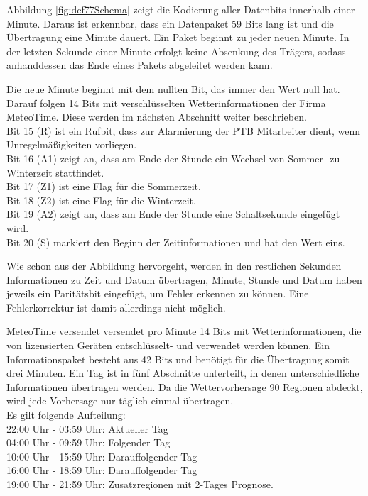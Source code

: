 \documentclass[a4paper,11pt]{article}
\newcounter{subsubsubsection}[subsubsection]
\begin{document}
\noindent
Abbildung \ref{fig:dcf77Schema} zeigt die Kodierung aller Datenbits innerhalb einer Minute. Daraus ist erkennbar, dass ein Datenpaket 59 Bits lang ist und
die Übertragung eine Minute dauert. Ein Paket beginnt zu jeder neuen Minute. In der letzten Sekunde einer Minute erfolgt keine Absenkung des Trägers, sodass anhanddessen
das Ende eines Pakets abgeleitet werden kann. 

\vspace{0.2cm}
\noindent
Die neue Minute beginnt mit dem nullten Bit, das immer den Wert null hat. Darauf folgen 14 Bits mit verschlüsselten Wetterinformationen der Firma MeteoTime.
Diese werden im nächsten Abschnitt weiter beschrieben. \\
Bit 15 (R) ist ein Rufbit, dass zur Alarmierung der PTB Mitarbeiter dient, wenn Unregelmäßigkeiten vorliegen. \\
Bit 16 (A1) zeigt an, dass am Ende der Stunde ein Wechsel von Sommer- zu Winterzeit stattfindet. \\
Bit 17 (Z1) ist eine Flag für die Sommerzeit. \\
Bit 18 (Z2) ist eine Flag für die Winterzeit. \\
Bit 19 (A2) zeigt an, dass am Ende der Stunde eine Schaltsekunde eingefügt wird. \\
Bit 20 (S) markiert den Beginn der Zeitinformationen und hat den Wert eins. 

\vspace{0.2cm}
\noindent
Wie schon aus der Abbildung hervorgeht, werden in den restlichen Sekunden Informationen zu Zeit und Datum übertragen, Minute, Stunde und Datum haben jeweils ein
Paritätsbit eingefügt, um Fehler erkennen zu können. Eine Fehlerkorrektur ist damit allerdings nicht möglich. 

\label{subsubsubsub:meteotime}

MeteoTime versendet versendet pro Minute 14 Bits mit Wetterinformationen, die von lizensierten Geräten entschlüsselt- und verwendet werden können. 
Ein Informationspaket besteht aus 42 Bits und benötigt für die Übertragung somit drei Minuten. Ein Tag ist in fünf Abschnitte unterteilt, in denen
unterschiedliche Informationen übertragen werden. Da die Wettervorhersage 90 Regionen abdeckt, wird jede Vorhersage nur täglich einmal übertragen. \\
Es gilt folgende Aufteilung: \\
22:00 Uhr - 03:59 Uhr: Aktueller Tag \\
04:00 Uhr - 09:59 Uhr: Folgender Tag \\
10:00 Uhr - 15:59 Uhr: Darauffolgender Tag \\
16:00 Uhr - 18:59 Uhr: Darauffolgender Tag \\
19:00 Uhr - 21:59 Uhr: Zusatzregionen mit 2-Tages Prognose. 
\end{document}
